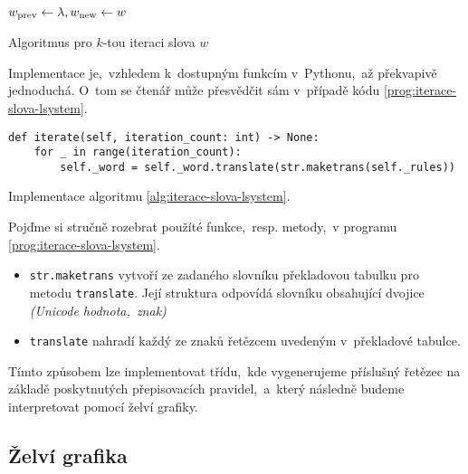 \begin{algorithm}[h]
    $w_{\textup{prev}}\gets\lambda,w_{\textup{new}}\gets w$\;
    \;
    \caption{Algoritmus pro $k$-tou iteraci slova $w$}
    \label{alg:iterace-slova-lsystem}
\end{algorithm}
Implementace je,~vzhledem k~dostupným funkcím v~Pythonu,~až překvapivě jednoduchá. O~tom se čtenář může přesvědčit sám v~případě kódu \ref{prog:iterace-slova-lsystem}.
\begin{program}[h]
\begin{lstlisting}[style=python]
def iterate(self, iteration_count: int) -> None:
    for _ in range(iteration_count):
        self._word = self._word.translate(str.maketrans(self._rules))
\end{lstlisting}
    \caption{Implementace algoritmu \ref{alg:iterace-slova-lsystem}.}
    \label{prog:iterace-slova-lsystem}
\end{program}
Pojďme si stručně rozebrat použíté funkce,~resp. metody,~v programu \ref{prog:iterace-slova-lsystem}.
\begin{itemize}
    \item \texttt{str.maketrans} vytvoří ze zadaného slovníku překladovou tabulku pro metodu \texttt{translate}. Její struktura odpovídá slovníku obsahující dvojice \emph{(Unicode hodnota,~znak)}
    \item \texttt{translate} nahradí každý ze znaků řetězcem uvedeným v~překladové tabulce.
\end{itemize}
Tímto způsobem lze implementovat třídu,~kde vygenerujeme příslušný řetězec na základě poskytnutých přepisovacích pravidel,~a~který následně budeme interpretovat pomocí želví grafiky.

\subsection{Želví grafika}\label{subsec:implementace-zelvi-grafiky}

